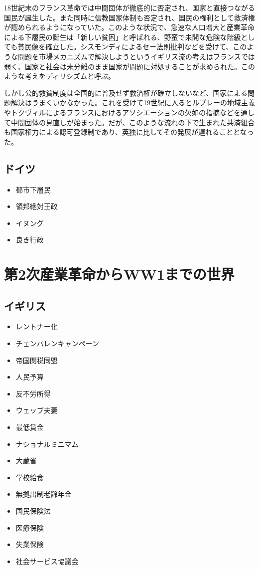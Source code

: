 \documentclass{jsarticle}
\begin{document}
18世紀末のフランス革命では中間団体が徹底的に否定され、国家と直接つながる国民が誕生した。また同時に信教国家体制も否定され、国民の権利として救済権が認められるようになっていた。このような状況で、急速な人口増大と産業革命による下層民の誕生は「新しい貧困」と呼ばれる、野蛮で未開な危険な階級としても貧民像を確立した。シスモンディによるセー法則批判などを受けて、このような問題を市場メカニズムで解決しようというイギリス流の考えはフランスでは弱く、国家と社会は未分離のまま国家が問題に対処することが求められた。このような考えをディリシズムと呼ぶ。

しかし公的救貧制度は全国的に普及せず救済権が確立しないなど、国家による問題解決はうまくいかなかった。これを受けて19世紀に入るとルプレーの地域主義やトクヴィルによるフランスにおけるアソシエーションの欠如の指摘などを通して中間団体の見直しが始まった。だが、このような流れの下で生まれた共済組合も国家権力による認可登録制であり、英独に比してその発展が遅れることとなった。

\subsection{ドイツ}
\begin{itemize}
	\item 都市下層民
	\item 領邦絶対王政
	\item イヌング
	\item 良き行政
\end{itemize}


\section{第2次産業革命からWW1までの世界}

\subsection{イギリス}
\begin{itemize}
	\item レントナー化
	\item チェンバレンキャンペーン
	\item 帝国関税同盟
	\item 人民予算
	\item 反不労所得
	\item ウェッブ夫妻
	\item 最低賃金
	\item ナショナルミニマム
	\item 大蔵省
	\item 学校給食
	\item 無拠出制老齢年金
	\item 国民保険法
	\item 医療保険
	\item 失業保険
	\item 社会サービス協議会
\end{itemize}
\end{document}
